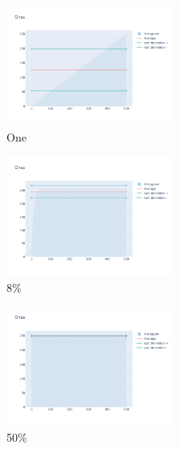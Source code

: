 \documentclass[12pt, fleqn]{report}                             %
\theoremstyle{break}                                            %
\begin{document}
      \begin{figure}[ht!]
        \centering
        \begin{subfigure}[b]{0.4\linewidth}
          \includegraphics[width=0.6\textwidth]{Images/156/dia-a.png}
          \caption{One}
        \end{subfigure}
        \begin{subfigure}[b]{0.4\linewidth}
          \includegraphics[width=0.6\textwidth]{Images/156/dia-b.png}
          \caption{8\%}
        \end{subfigure}
        \begin{subfigure}[b]{0.4\linewidth}
          \includegraphics[width=0.6\textwidth]{Images/156/dia-c.png}
          \caption{50\%}
        \end{subfigure}
        \begin{subfigure}[b]{0.4\linewidth}

\end{subfigure}
\end{figure}
\end{document}
